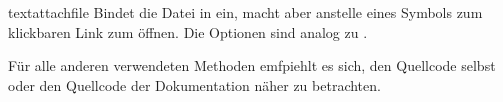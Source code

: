 \documentclass{sopra-base}
\begin{document}
\begin{command}{textattachfile}{}
    Bindet die Datei in  ein, macht aber anstelle eines Symbols  zum klickbaren Link zum öffnen. Die Optionen sind analog zu .
\end{command}

Für alle anderen verwendeten Methoden emfpiehlt es sich, den Quellcode selbst oder den Quellcode der Dokumentation näher zu betrachten.
\end{document}
